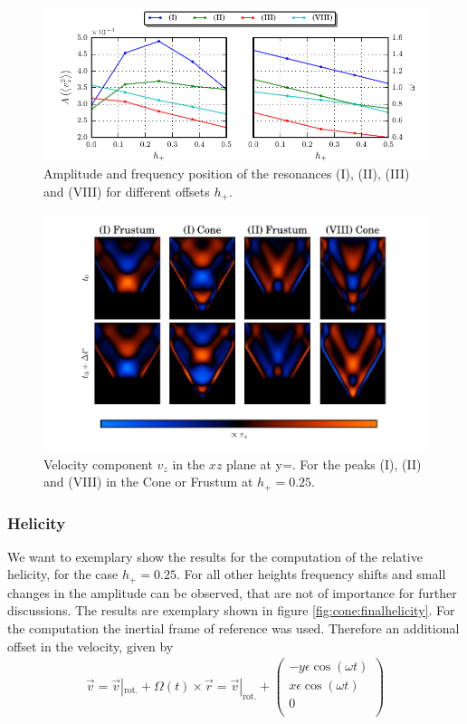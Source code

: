 {\begin{figure}[!tp]
  \centering
  \includegraphics{gfx/cone/final/amp_pos.pdf}
  \caption{
      \label{fig:cone:finalampmax}
      Amplitude and frequency position of the resonances (\RN{1}), (\RN{2}), (\RN{3}) and (\RN{8})
      for different offsets $h_+$.
    }
\end{figure}
\begin{figure}[!bp]
  \centering
  \includegraphics{gfx/cone/final/modes.pdf}
  \caption{
      \label{fig:cone:finalmodesexp}
      Velocity component $v_z$ in the $xz$ plane at y=.
       For the peaks (\RN{1}), (\RN{2}) and (\RN{8}) in the Cone or Frustum at $h_+=0.25$.
    }
\end{figure}
\clearpage

\subsubsection{Helicity}

We want to exemplary show the results for the computation of the relative helicity, for  the case $h_+=0.25$.
For all other heights frequency shifts and small changes in the amplitude can be observed,
that are not of importance for further discussions.
The results are exemplary shown in figure \ref{fig:cone:finalhelicity}.
For the computation the inertial frame of reference was used.
Therefore an additional offset in the velocity,  given by
\begin{align}
    \vec{v} = \vec{v}|_{\text{rot.}} + \Omega(t) \times \vec{r} = \vec{v}|_{\text{rot.}} +
     \begin{pmatrix}
           -y \epsilon \cos(\omega t) \\
           x \epsilon \cos(\omega t) \\
           0\\
         \end{pmatrix}
\end{align}

}
